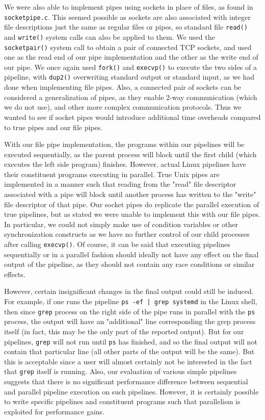 We were also able to implement pipes using sockets in place of files, as found in \texttt{socketpipe.c}. This seemed possible as sockets are also associated with integer file descriptions just the same as regular files or pipes, so standard file \texttt{read()} and \texttt{write()} system calls can also be applied to them. We used the \texttt{socketpair()} system call to obtain a pair of connected TCP sockets, and used one as the read end of our pipe implementation and the other as the write end of our pipe. We once again used \texttt{fork()} and \texttt{execvp()} to execute the two sides of a pipeline, with \texttt{dup2()} overwriting standard output or standard input, as we had done when implementing file pipes. Also, a connected pair of sockets can be considered a generalization of pipes, as they enable 2-way communication (which we do not use), and other more complex communication protocols. Thus we wanted to see if socket pipes would introduce additional time overheads compared to true pipes and our file pipes.

With our file pipe implementation, the programs within our pipelines will be executed sequentially, as the parent process will block until the first child (which executes the left side program) finishes. However, actual Linux pipelines have their constituent programs executing in parallel. True Unix pipes are implemented in a manner such that reading from the "read" file descriptor associated with a pipe will block until another process has written to the "write" file descriptor of that pipe. Our socket pipes do replicate the parallel execution of true pipelines, but as stated we were unable to implement this with our file pipes. In particular, we could not simply make use of condition variables or other synchronization constructs as we have no further control of our child processes after calling \texttt{execvp()}. Of course, it can be said that executing pipelines sequentially or in a parallel fashion should ideally not have any effect on the final output of the pipeline, as they should not contain any race conditions or similar effects. 

However, certain insignificant changes in the final output could still be induced.  For example, if one runs the pipeline \texttt{ps -ef | grep systemd} in the Linux shell, then since \texttt{grep} process on the right side of the pipe runs in parallel with the \texttt{ps} process, the output will have an "additional" line corresponding the grep process itself (in fact, this may be the only part of the reported output). But for our pipelines, \texttt{grep} will not run until \texttt{ps} has finished, and so the final output will not contain that particular line (all other parts of the output will be the same). But this is acceptable since a user will almost certainly not be interested in the fact that \texttt{grep} itself is running. Also, our evaluation of various simple pipelines suggests that there is no significant performance difference between sequential and parallel pipeline execution on such pipelines. However, it is certainly possible to write specific pipelines and constituent programs such that parallelism is exploited for performance gains.


